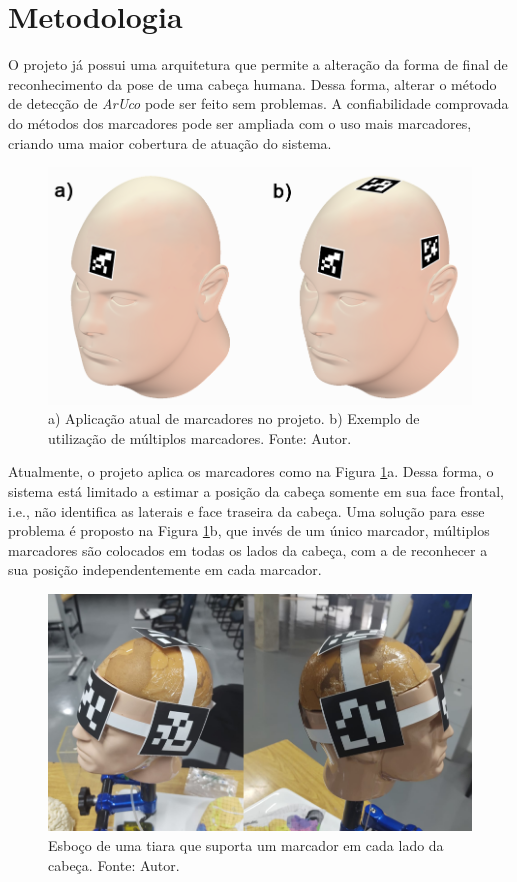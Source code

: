 \section{Metodologia}

O projeto já possui uma arquitetura que permite a alteração da forma de final de reconhecimento da pose de uma cabeça humana. Dessa forma, alterar o método de detecção de \textit{ArUco} pode ser feito sem problemas. A confiabilidade comprovada do métodos dos marcadores pode ser ampliada com o uso mais marcadores, criando uma maior cobertura de atuação do sistema.

\begin{figure}[ht]
    \centering
    \includegraphics[width=.6\linewidth]{figuras/head_marker.png}
    \caption{a) Aplicação atual de marcadores no projeto. b) Exemplo de utilização de múltiplos marcadores. Fonte: Autor.}
    \label{fig:head-markers}
\end{figure}

Atualmente, o projeto aplica os marcadores como na Figura \ref{fig:head-markers}a. Dessa forma, o sistema está limitado a estimar a posição da cabeça somente em sua face frontal, i.e., não identifica as laterais e face traseira da cabeça. Uma solução para esse problema é proposto na Figura \ref{fig:head-markers}b, que invés de um único marcador, múltiplos marcadores são colocados em todas os lados da cabeça, com a de reconhecer a sua posição independentemente em cada marcador.


\begin{figure}[ht]
    \centering
    \includegraphics[width=.6\linewidth]{figuras/tiara.png}
    \caption{Esboço de uma tiara que suporta um marcador em cada lado da cabeça. Fonte: Autor.}
    \label{fig:tiara}
\end{figure}

